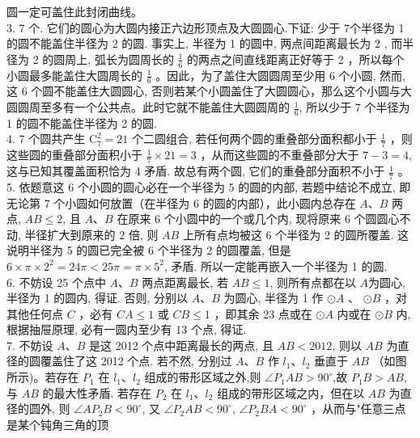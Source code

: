 \documentclass[10pt]{article}
\begin{document}
圆一定可盖住此封闭曲线。\\
3. 7 个. 它们的圆心为大圆内接正六边形顶点及大圆圆心.下证: 少于 7个半径为 1 的圆不能盖住半径为 2 的圆. 事实上, 半径为 1 的圆中, 两点间距离最长为 2 , 而半径为 2 的圆周上, 弧长为圆周长的 $\frac{1}{6}$ 的两点之间直线距离正好等于 2 ，所以每个小圆最多能盖住大圆周长的 $\frac{1}{6}$ 。因此，为了盖住大圆圆周至少用 6 个小圆, 然而, 这 6 个圆不能盖住大圆圆心, 否则若某个小圆盖住了大圆圆心，那么这个小圆与大圆圆周至多有一个公共点。此时它就不能盖住大圆圆周的 $\frac{1}{6}$, 所以少于 7 个半径为 1 的圆不能盖住半径为 2 的圆.\\
4. 7 个圆共产生 $\mathrm{C}_{7}^{2}=21$ 个二圆组合, 若任何两个圆的重叠部分面积都小于 $\frac{1}{7}$ ，则这些圆的重叠部分面积小于 $\frac{1}{7} \times 21=3$ ，从而这些圆的不重叠部分大于 $7-3=4$, 这与已知其覆盖面积恰为 4 矛盾. 故总有两个圆, 它们的重叠部分面积不小于 $\frac{1}{7}$ 。\\
5. 依题意这 6 个小圆的圆心必在一个半径为 5 的圆的内部, 若题中结论不成立, 即无论第 7 个小圆如何放置（在半径为 6 的圆的内部），此小圆内总存在 $A 、 B$ 两点, $A B \leqslant 2$, 且 $A 、 B$ 在原来 6 个小圆中的一个或几个内, 现将原来 6 个圆圆心不动, 半径扩大到原来的 2 倍, 则 $A B$ 上所有点均被这 6 个半径为 2 的圆所覆盖. 这说明半径为 5 的圆已完全被 6 个半径为 2 的圆覆盖, 但是 $6 \times \pi \times 2^{2}=24 \pi<25 \pi=\pi \times 5^{2}$, 矛盾. 所以一定能再嵌入一个半径为 1 的圆.\\
6. 不妨设 25 个点中 $A 、 B$ 两点距离最长, 若 $A B \leqslant 1$, 则所有点都在以 $A$为圆心, 半径为 1 的圆内, 得证. 否则, 分别以 $A 、 B$ 为圆心, 半径为 1 作 $\odot A$ 、 $\odot B$ ，对其他任何点 $C$ ，必有 $C A \leqslant 1$ 或 $C B \leqslant 1$ ，即其余 23 点或在 $\odot A$ 内或在 $\odot B$ 内, 根据抽屉原理, 必有一圆内至少有 13 个点, 得证.\\
7. 不妨设 $A 、 B$ 是这 2012 个点中距离最长的两点, 且 $A B<2012$, 则以 $A B$ 为直径的圆覆盖住了这 2012 个点. 若不然, 分别过 $A 、 B$ 作 $l_{1} 、 l_{2}$ 垂直于 $A B$ （如图所示)。若存在 $P_{1}$ 在 $l_{1} 、 l_{2}$ 组成的带形区域之外,则 $\angle P_{1} A B>90^{\circ}$,故 $P_{1} B>A B$, 与 $A B$ 的最大性矛盾. 若存在 $P_{2}$ 在 $l_{1} 、 l_{2}$ 组成的带形区域之内，但在以 $A B$ 为直径的圆外, 则 $\angle A P_{2} B<90^{\circ}$, 又 $\angle P_{2} A B<90^{\circ}$, $\angle P_{2} B A<90^{\circ}$ ，从而与"任意三点是某个钝角三角的顶\\
\end{document}

